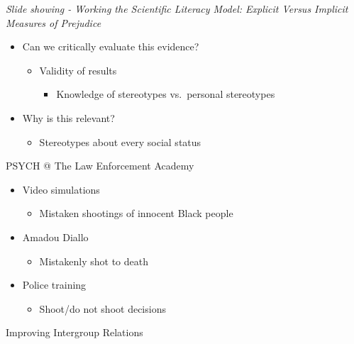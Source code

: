 \documentclass[
]{book}
\providecommand{\tightlist}{%
  \setlength{\itemsep}{0pt}\setlength{\parskip}{0pt}}
\begin{document}
\begin{reflect}
\emph{Slide showing - Working the Scientific Literacy Model: Explicit Versus Implicit Measures of Prejudice }

\begin{itemize}
\tightlist
\item
  Can we critically evaluate this evidence?

  \begin{itemize}
  \tightlist
  \item
    Validity of results

    \begin{itemize}
    \tightlist
    \item
      Knowledge of stereotypes vs.~personal stereotypes\\
    \end{itemize}
  \end{itemize}
\item
  Why is this relevant?

  \begin{itemize}
  \tightlist
  \item
    Stereotypes about every social status
  \end{itemize}
\end{itemize}

PSYCH @ The Law Enforcement Academy

\begin{itemize}
\tightlist
\item
  Video simulations

  \begin{itemize}
  \tightlist
  \item
    Mistaken shootings of innocent Black people\\
  \end{itemize}
\item
  Amadou Diallo

  \begin{itemize}
  \tightlist
  \item
    Mistakenly shot to death\\
  \end{itemize}
\item
  Police training

  \begin{itemize}
  \tightlist
  \item
    Shoot/do not shoot decisions
  \end{itemize}
\end{itemize}

Improving Intergroup Relations


\end{reflect}
\end{document}
